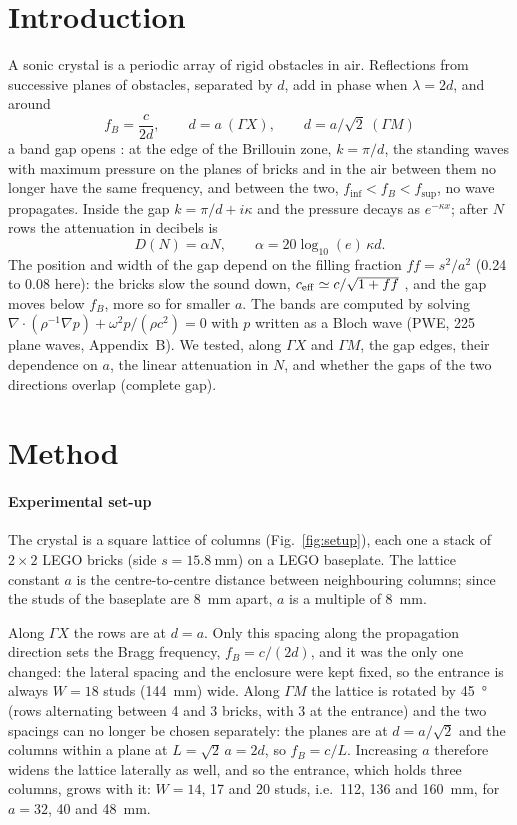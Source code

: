 \documentclass[9pt,a4paper,twocolumn]{extarticle}
\newcommand{\GX}{\ensuremath{\Gamma X}}
\newcommand{\GM}{\ensuremath{\Gamma M}}
\newcommand{\finf}{\ensuremath{f_{\mathrm{inf}}}}
\newcommand{\fsup}{\ensuremath{f_{\mathrm{sup}}}}
\begin{document}
\section{Introduction}
A sonic crystal is a periodic array of rigid obstacles in air. Reflections from successive planes of obstacles, separated by $d$, add in phase when $\lambda=2d$, and around
\begin{equation}
f_B=\frac{c}{2d},\qquad d=a\ (\GX),\qquad d=a/\sqrt2\ (\GM)
\end{equation}
a band gap opens \cite{mart,kush}: at the edge of the Brillouin zone, $k=\pi/d$, the standing waves with maximum pressure on the planes of bricks and in the air between them no longer have the same frequency, and between the two, $\finf<f_B<\fsup$, no wave propagates. Inside the gap $k=\pi/d+i\kappa$ and the pressure decays as $e^{-\kappa x}$; after $N$ rows the attenuation in decibels is
\begin{equation}
D(N)=\alpha N,\qquad \alpha=20\log_{10}(e)\,\kappa d.
\end{equation}
The position and width of the gap depend on the filling fraction $ff=s^2/a^2$ (0.24 to 0.08 here): the bricks slow the sound down, $c_{\rm eff}\simeq c/\sqrt{1+ff}$ \cite{krokhin}, and the gap moves below $f_B$, more so for smaller $a$. The bands are computed by solving $\nabla\!\cdot(\rho^{-1}\nabla p)+\omega^2p/(\rho c^2)=0$ with $p$ written as a Bloch wave (PWE, 225 plane waves, Appendix~B). We tested, along \GX{} and \GM, the gap edges, their dependence on $a$, the linear attenuation in $N$, and whether the gaps of the two directions overlap (complete gap).

\section{Method}

\paragraph{Experimental set-up}
The crystal is a square lattice of columns (Fig.~\ref{fig:setup}), each one a stack of $2\times2$ LEGO bricks (side $s = \SI{15.8}{\milli\metre}$) on a LEGO baseplate. The lattice constant $a$ is the centre-to-centre distance between neighbouring columns; since the studs of the baseplate are \SI{8}{\milli\metre} apart, $a$ is a multiple of \SI{8}{\milli\metre}.

Along $\Gamma X$ the rows are at $d = a$. Only this spacing along the propagation direction sets the Bragg frequency, $f_B = c/(2d)$, and it was the only one changed: the lateral spacing and the enclosure were kept fixed, so the entrance is always $W = 18$ studs (\SI{144}{\milli\metre}) wide. Along $\Gamma M$ the lattice is rotated by \SI{45}{\degree} (rows alternating between 4 and 3 bricks, with 3 at the entrance) and the two spacings can no longer be chosen separately: the planes are at $d = a/\sqrt{2}$ and the columns within a plane at $L = \sqrt{2}\,a = 2d$, so $f_B = c/L$. Increasing $a$ therefore widens the lattice laterally as well, and so the entrance, which holds three columns, grows with it: $W = 14$, 17 and 20 studs, i.e.\ 112, 136 and \SI{160}{\milli\metre}, for $a = 32$, 40 and \SI{48}{\milli\metre}.
\end{document}
